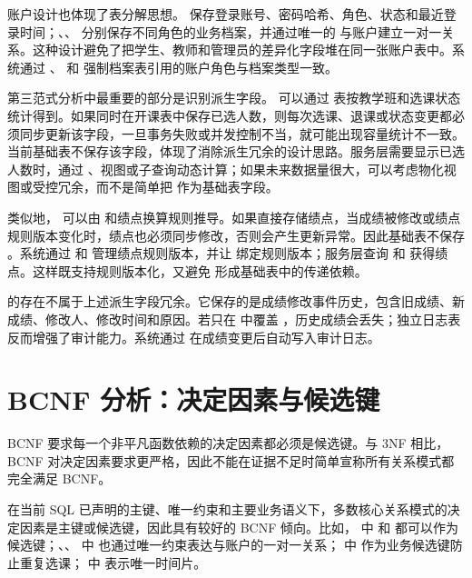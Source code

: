 账户设计也体现了表分解思想。 保存登录账号、密码哈希、角色、状态和最近登录时间；、、 分别保存不同角色的业务档案，并通过唯一的  与账户建立一对一关系。这种设计避免了把学生、教师和管理员的差异化字段堆在同一张账户表中。系统通过 、 和  强制档案表引用的账户角色与档案类型一致。

第三范式分析中最重要的部分是识别派生字段。 可以通过  表按教学班和选课状态统计得到。如果同时在开课表中保存已选人数，则每次选课、退课或状态变更都必须同步更新该字段，一旦事务失败或并发控制不当，就可能出现容量统计不一致。当前基础表不保存该字段，体现了消除派生冗余的设计思路。服务层需要显示已选人数时，通过 、视图或子查询动态计算；如果未来数据量很大，可以考虑物化视图或受控冗余，而不是简单把  作为基础表字段。

类似地， 可以由  和绩点换算规则推导。如果直接存储绩点，当成绩被修改或绩点规则版本变化时，绩点也必须同步修改，否则会产生更新异常。因此基础表不保存 。系统通过  和  管理绩点规则版本，并让  绑定规则版本；服务层查询  和  获得绩点。这样既支持规则版本化，又避免  形成基础表中的传递依赖。

 的存在不属于上述派生字段冗余。它保存的是成绩修改事件历史，包含旧成绩、新成绩、修改人、修改时间和原因。若只在  中覆盖 ，历史成绩会丢失；独立日志表反而增强了审计能力。系统通过  在成绩变更后自动写入审计日志。

\section{BCNF 分析：决定因素与候选键}

BCNF 要求每一个非平凡函数依赖的决定因素都必须是候选键。与 3NF 相比，BCNF 对决定因素要求更严格，因此不能在证据不足时简单宣称所有关系模式都完全满足 BCNF。

在当前 SQL 已声明的主键、唯一约束和主要业务语义下，多数核心关系模式的决定因素是主键或候选键，因此具有较好的 BCNF 倾向。比如， 中  和  都可以作为候选键；、、 中  也通过唯一约束表达与账户的一对一关系； 中  作为业务候选键防止重复选课； 中  表示唯一时间片。

